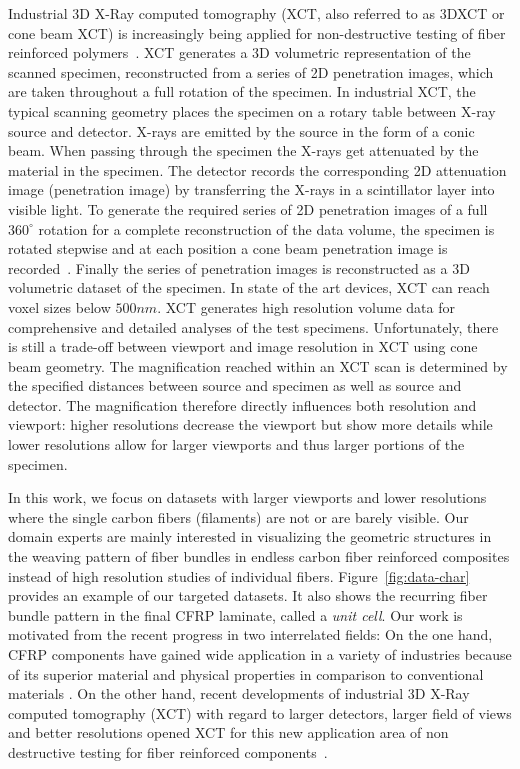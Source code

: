 Industrial 3D X-Ray computed tomography (XCT, also referred to as 3DXCT or cone beam XCT) is increasingly being applied for non-destructive testing of fiber reinforced polymers~\cite{Kastner2012}. XCT generates a 3D volumetric representation of the scanned specimen, reconstructed from a series of 2D penetration images, which are taken throughout a full rotation of the specimen. In industrial XCT, the typical scanning geometry places the specimen on a rotary table between X-ray source and detector. X-rays are emitted by the source in the form of a conic beam. When passing through the specimen the X-rays get attenuated by the material in the specimen. The detector records the corresponding 2D attenuation image (penetration image) by transferring the X-rays in a scintillator layer into visible light. To generate the required series of 2D penetration images of a full $360^\circ$ rotation for a complete reconstruction of the data volume, the specimen is rotated stepwise and at each position a cone beam penetration image is recorded~\cite{heinzl-2008-thesis}. Finally the series of penetration images is  reconstructed as a 3D volumetric dataset of the specimen. 
In state of the art devices, XCT can reach voxel sizes below $500 nm$. XCT generates high resolution volume data for comprehensive and detailed analyses of the test specimens. Unfortunately, there is still a trade-off between viewport and image resolution in XCT using cone beam geometry. The magnification reached within an XCT scan is determined by the specified distances between source and specimen as well as source and detector. The magnification therefore directly influences both resolution and viewport: higher resolutions decrease the viewport but show more details while lower resolutions allow for larger viewports and thus larger portions of the specimen.

In this work, we focus on datasets with larger viewports and lower resolutions where the single carbon fibers (filaments) are not or are  barely visible. Our domain experts are mainly interested in visualizing the geometric structures in the weaving pattern of fiber bundles in endless carbon fiber reinforced composites instead of high resolution studies of  individual fibers.
Figure~\ref{fig:data-char} provides an example of our targeted datasets. It also shows the recurring fiber bundle pattern in the final CFRP laminate, called a \textit{unit cell}.
Our work is motivated from the recent progress in two interrelated fields: On the one hand, CFRP components have gained wide application in a variety of industries  because of its superior material and physical properties in comparison to conventional materials \cite{Karpat2012}. On the other hand, recent developments of industrial 3D X-Ray computed tomography (XCT) with regard to larger detectors, larger field of views and better resolutions opened XCT for this new application area of non destructive testing for fiber reinforced components~\cite{Schilling2005}. 

